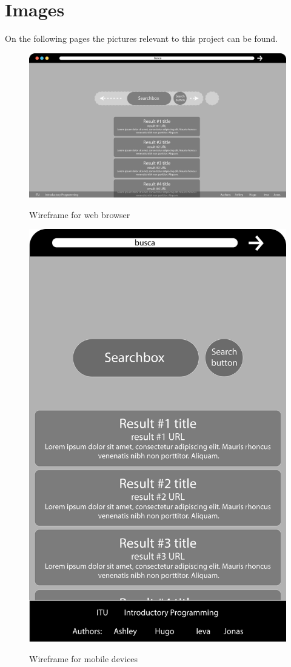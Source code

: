 \chapter{Images}
\label{app:images}
On the following pages the pictures relevant to this project can be found.

\begin{figure}
    \centering
    \caption{Wireframe for web browser}
    \includegraphics[scale=0.3]{figures/Wireframe_for_fullsize_webbrower.PNG}
    \label{fig:WireframeBrowser}
\end{figure}


\begin{figure}[p]
    \centering
    \caption{Wireframe for mobile devices}
    \includegraphics[scale=0.4]{figures/Wireframe_for_mobile_browser.png}
    \label{fig:WireframeMobile}
\end{figure}